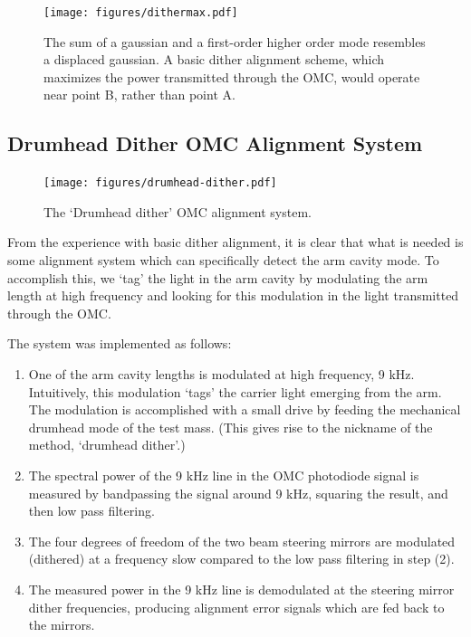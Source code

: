 \begin{figure}
\texttt{[image: figures/dithermax.pdf]}
\caption[Modal decomposition of a displaced Gaussian]{\label{fig:dithermax}The sum of a gaussian and a first-order higher order mode
  resembles a displaced gaussian.  A basic dither alignment scheme,
  which maximizes the power transmitted through the OMC, would
  operate near point B, rather than point A.}
\end{figure}




\subsection{Drumhead Dither OMC Alignment System}

\begin{figure}
\texttt{[image: figures/drumhead-dither.pdf]}
\caption[Drumhead dither system]{The `Drumhead dither' OMC alignment
  system.\label{fig:drumhead-dither}}
\end{figure}

From the experience with basic dither alignment, it is clear that what is
needed is some alignment system which can specifically detect the arm
cavity mode.  To accomplish this, we `tag' the light in the arm cavity by
modulating the arm length at high frequency and looking for this modulation
in the light transmitted through the OMC. 

The system was implemented as follows:

\begin{enumerate}
\item One of the arm cavity lengths is modulated at high frequency, 9
  kHz.  Intuitively, this modulation `tags' the carrier light emerging
  from the arm.  The modulation is accomplished with a small drive by
  feeding the mechanical drumhead mode of the test mass. (This gives
  rise to the nickname of the method, `drumhead dither'.)
\item The spectral power of the 9 kHz line in the OMC photodiode
  signal is measured by bandpassing the signal around 9 kHz, squaring
  the result, and then low pass filtering.
\item The four degrees of freedom of the two beam steering mirrors are
  modulated (dithered) at a frequency slow compared to the low pass
  filtering in step (2).
\item The measured power in the 9 kHz line is demodulated at the
  steering mirror dither frequencies, producing alignment error
  signals which are fed back to the mirrors.
\end{enumerate}

